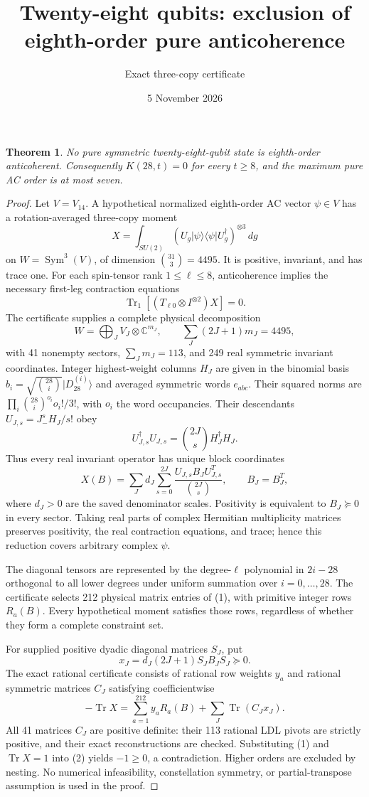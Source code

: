 \documentclass[11pt]{article}
\newtheorem{theorem}{Theorem}
\newcommand{\Tr}{\operatorname{Tr}}
\begin{document}
\title{Twenty-eight qubits: exclusion of eighth-order pure anticoherence}
\author{Exact three-copy certificate}\date{5 November 2026}\maketitle
\begin{theorem}
No pure symmetric twenty-eight-qubit state is eighth-order anticoherent.
Consequently $K(28,t)=0$ for every $t\ge8$, and the maximum pure AC order is at most seven.
\end{theorem}
\begin{proof}
Let $V=V_{14}$. A hypothetical normalized eighth-order AC vector $\psi\in V$ has a rotation-averaged three-copy moment
\[
X=\int_{SU(2)}(U_g|\psi\rangle\langle\psi|U_g^\dagger)^{\otimes3}\,dg
\]
on $W=\operatorname{Sym}^3(V)$, of dimension $\binom{31}{3}=4495$.
It is positive, invariant, and has trace one. For each spin-tensor rank $1\le\ell\le8$, anticoherence implies the necessary first-leg contraction equations
\[
\Tr_1[(T_{\ell0}\otimes I^{\otimes2})X]=0. \tag{1}
\]
The certificate supplies a complete physical decomposition
\[
W=\bigoplus_J V_J\otimes\mathbb C^{m_J},\qquad
\sum_J(2J+1)m_J=4495,
\]
with 41 nonempty sectors, $\sum_Jm_J=113$, and 249 real symmetric invariant coordinates. Integer highest-weight columns $H_J$ are given in the binomial basis $b_i=\sqrt{\binom{28}{i}}|D_{28}^{(i)}\rangle$ and averaged symmetric words $e_{abc}$. Their squared norms are $\prod_i\binom{28}{i}^{o_i}o_i!/3!$, with $o_i$ the word occupancies. Their descendants $U_{J,s}=J_-^sH_J/s!$ obey
\[
U_{J,s}^\dagger U_{J,s}=\binom{2J}{s}H_J^\dagger H_J.
\]
Thus every real invariant operator has unique block coordinates
\[
X(B)=\sum_Jd_J\sum_{s=0}^{2J}\frac{U_{J,s}B_JU_{J,s}^T}{\binom{2J}{s}},\qquad B_J=B_J^T,
\]
where $d_J>0$ are the saved denominator scales. Positivity is equivalent to $B_J\succeq0$ in every sector. Taking real parts of complex Hermitian multiplicity matrices preserves positivity, the real contraction equations, and trace; hence this reduction covers arbitrary complex $\psi$.

The diagonal tensors are represented by the degree-$\ell$ polynomial in $2i-28$ orthogonal to all lower degrees under uniform summation over $i=0,\ldots,28$. The certificate selects 212 physical matrix entries of (1), with primitive integer rows $R_a(B)$. Every hypothetical moment satisfies those rows, regardless of whether they form a complete constraint set.

For supplied positive dyadic diagonal matrices $S_J$, put
\[
x_J=d_J(2J+1)S_JB_JS_J\succeq0.
\]
The exact rational certificate consists of rational row weights $y_a$ and rational symmetric matrices $C_J$ satisfying coefficientwise
\[
\boxed{-\Tr X=\sum_{a=1}^{212}y_aR_a(B)+\sum_J\Tr(C_Jx_J).} \tag{2}
\]
All 41 matrices $C_J$ are positive definite: their 113 rational LDL pivots are strictly positive, and their exact reconstructions are checked. Substituting (1) and $\Tr X=1$ into (2) yields $-1\ge0$, a contradiction. Higher orders are excluded by nesting. No numerical infeasibility, constellation symmetry, or partial-transpose assumption is used in the proof.
\end{proof}
\end{document}
